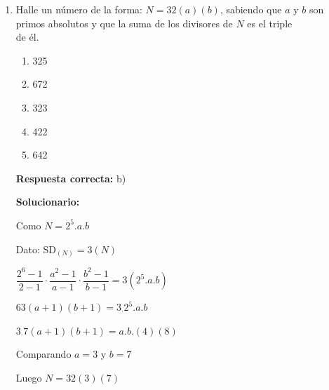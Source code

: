 \begin{enumerate}

	\vspace{0.5cm}

	\noindent Luego $S = 105, 210, 315, \dots$

	\vspace{0.5cm}

	\noindent Pero $S < 180 \Longrightarrow S=105$

	\vspace{0.5cm}

	\noindent Sobrevivieron las personas.

	\vspace{6mm}



	\item \noindent Halle un n\'umero de la forma: $N=32(a)(b)$, sabiendo que $a$ y $b$ son \\
	primos absolutos y que la suma de los divisores de $N$ es el triple \\
	de \'el.
	\begin{enumerate}[label=\alph*)]
		\item 325
		\item 672
		\item 323
		\item 422
		\item 642
	\end{enumerate}
	\textbf{Respuesta correcta:} b)

	\vspace{2mm}
	\textbf{Solucionario:}

	\noindent Como $N = 2^5. a . b$

	\noindent Dato: $\text{SD}_{(N)} = 3 (N)$

	\noindent $\dfrac{2^{6}-1}{2-1} \cdot \dfrac{a^{2}-1}{a-1} \cdot \dfrac{b^{2}-1}{b-1} = 3 (2^5 . a.b)$

	\noindent $63 (a+1)(b+1)= 3_\cdot 2^5.a.b$

	\noindent $3_\cdot 7 (a+1)(b+1)= a.b.(4)(8) $

	\vspace{0.1cm}



	\noindent Comparando $a=3$ y $b=7$

	\vspace{0.1cm}

	\noindent Luego $N=32(3)(7)$


\end{enumerate}
